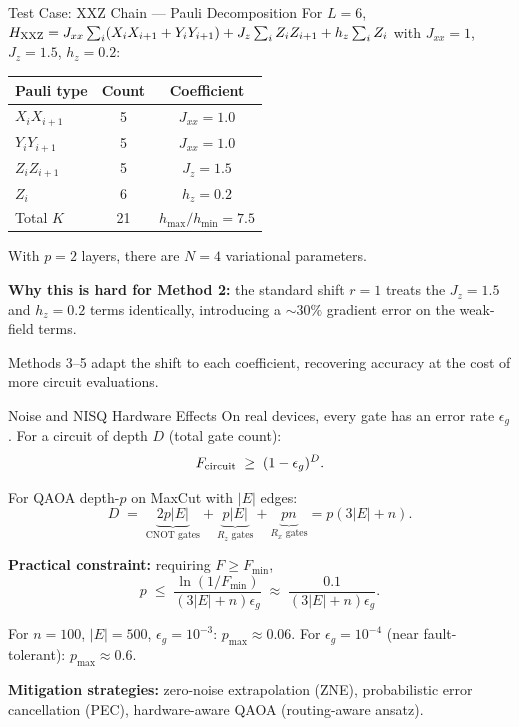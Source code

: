 \documentclass{beamer}
\begin{document}

\begin{frame}{Test Case: XXZ Chain — Pauli Decomposition}
For $L=6$, $H_{\rm XXZ} = J_{xx}\sum_i(X_iX_{i+1}+Y_iY_{i+1})
+ J_z\sum_iZ_iZ_{i+1} + h_z\sum_i Z_i$
with $J_{xx}=1$, $J_z=1.5$, $h_z=0.2$:

\medskip
\begin{center}
\small
\begin{tabular}{lcc}
\hline
Pauli type & Count & Coefficient \\
\hline
$X_iX_{i+1}$ & 5 & $J_{xx} = 1.0$ \\
$Y_iY_{i+1}$ & 5 & $J_{xx} = 1.0$ \\
$Z_iZ_{i+1}$ & 5 & $J_z = 1.5$ \\
$Z_i$        & 6 & $h_z = 0.2$ \\
\hline
Total $K$ & 21 & $h_{\max}/h_{\min} = 7.5$ \\
\hline
\end{tabular}
\end{center}

\medskip
With $p=2$ layers, there are $N=4$ variational parameters.

\textbf{Why this is hard for Method 2:} the standard shift $r=1$
treats the $J_z=1.5$ and $h_z=0.2$ terms identically, introducing
a $\sim 30\%$ gradient error on the weak-field terms.

Methods 3--5 adapt the shift to each coefficient, recovering accuracy
at the cost of more circuit evaluations.
\end{frame}


\begin{frame}{Noise and NISQ Hardware Effects}
On real devices, every gate has an error rate $\epsilon_g$.
For a circuit of depth $D$ (total gate count):
\[
F_{\rm circuit} \;\ge\; (1-\epsilon_g)^D.
\]

For QAOA depth-$p$ on MaxCut with $|E|$ edges:
\[
D \;=\; \underbrace{2p|E|}_{\text{CNOT gates}}
+ \underbrace{p|E|}_{\text{$R_z$ gates}}
+ \underbrace{pn}_{\text{$R_x$ gates}}
= p(3|E|+n).
\]

\medskip

\textbf{Practical constraint:} requiring $F\ge F_{\min}$,
\[
p \;\le\; \frac{\ln(1/F_{\min})}{(3|E|+n)\epsilon_g}
\;\approx\; \frac{0.1}{(3|E|+n)\epsilon_g}.
\]

For $n=100$, $|E|=500$, $\epsilon_g=10^{-3}$: $p_{\max}\approx 0.06$.
For $\epsilon_g=10^{-4}$ (near fault-tolerant): $p_{\max}\approx 0.6$.

\medskip

\textbf{Mitigation strategies:}
zero-noise extrapolation (ZNE), probabilistic error cancellation (PEC),
hardware-aware QAOA (routing-aware ansatz).
\end{frame}
\end{document}
